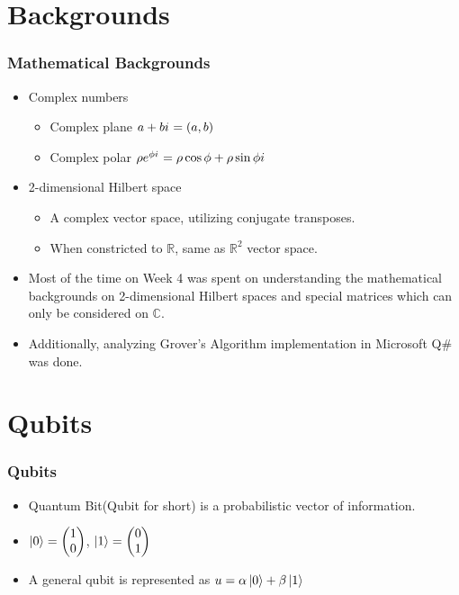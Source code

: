 \documentclass{beamer}
\newcommand{\iu}{{i\mkern1mu}}
\begin{document}
    \section{Backgrounds}

    \begin{frame}
        \frametitle{Mathematical Backgrounds}
        \begin{itemize}
            \item Complex numbers
            \begin{itemize}
                \item Complex plane $a+b\iu=(a,b)$
                \item Complex polar $\rho e^{\phi \iu}=\rho \cos \phi + \rho \sin \phi \iu$
            \end{itemize}
            \item 2-dimensional Hilbert space
            \begin{itemize}
                \item A complex vector space, utilizing conjugate transposes.
                \item When constricted to $\mathbb{R}$, same as $\mathbb{R}^2$ vector space.
            \end{itemize}
            \item Most of the time on Week 4 was spent on understanding the mathematical backgrounds on 2-dimensional Hilbert spaces and special matrices which can only be considered on $\mathbb{C}$.
            \item Additionally, analyzing Grover's Algorithm implementation in Microsoft Q\# was done.
        \end{itemize}
    \end{frame}

    \section{Qubits}
    \begin{frame}
        \frametitle{Qubits}
        \begin{itemize}
            \item Quantum Bit(Qubit for short) is a probabilistic vector of information.
            \item $\ket{0}=\begin{pmatrix} 1 \\ 0 \end{pmatrix}$, $\ket{1}=\begin{pmatrix} 0 \\ 1 \end{pmatrix}$
            \item A general qubit is represented as $u=\alpha \ket{0}+\beta \ket{1}$
        \end{itemize}
    \end{frame}
\end{document}
